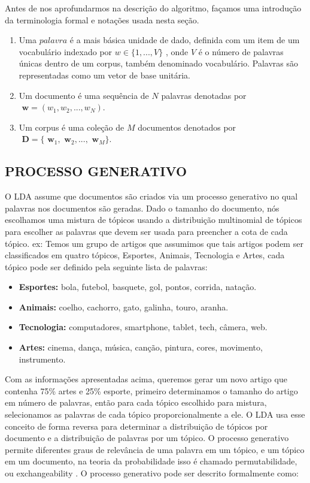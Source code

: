 \documentclass[12pt,a4paper]{article}
\begin{document}
  Antes de nos aprofundarmos na descrição do algoritmo, façamos uma introdução da terminologia formal e notações usada nesta seção.
  
  \begin{enumerate}
    \item Uma $palavra$ é a mais básica unidade de dado, definida com um item de um vocabulário indexado por \(w \in \{1,. . . , V\}\)  , onde $V$ é o número de palavras únicas dentro de um corpus, também denominado vocabulário. Palavras são representadas como um vetor de base unitária.
    \item Um documento é uma sequência de $N$ palavras denotadas por \(\textbf{ w} = (w_1, w_2,. . . ,  w_N)\).
    \item Um corpus é uma coleção de $M$ documentos denotados por \(\textbf{ D} = \{\textbf{ w}_1, \textbf{ w}_2, . . ., \textbf{ w}_M\}\).
  \end{enumerate}
  
  
  
  \subsection{PROCESSO GENERATIVO}
  O LDA assume que documentos são criados via um processo generativo no qual palavras nos documentos são geradas. Dado o tamanho do documento, nós escolhamos uma mistura de tópicos usando a distribuição multinomial de tópicos para escolher as palavras que devem ser usada para preencher a cota de cada tópico. ex: Temos um grupo de artigos que assumimos que tais artigos podem ser classificados em quatro tópicos, Esportes, Animais, Tecnologia e Artes, cada tópico pode ser definido pela seguinte lista de palavras:
  
  \begin{itemize}
    \item \textbf{ Esportes:} bola, futebol, basquete, gol, pontos, corrida, natação.
    \item \textbf{ Animais:} coelho, cachorro, gato, galinha, touro, aranha.
    \item \textbf{ Tecnologia:} computadores, smartphone, tablet, tech, câmera, web.
    \item \textbf{ Artes:} cinema, dança, música, canção, pintura, cores, movimento, instrumento.
  \end{itemize}
  
  Com as informações apresentadas acima, queremos gerar um novo artigo que contenha 75\% artes e 25\% esporte, primeiro determinamos o tamanho do artigo em número de palavras, então para cada tópico escolhido para mistura, selecionamos as palavras de cada tópico proporcionalmente a ele. O LDA usa esse conceito de forma reversa para determinar a distribuição de tópicos por documento e a distribuição de palavras por um tópico. O processo generativo permite diferentes graus de relevância de uma palavra em um tópico, e um tópico em um documento, na teoria da probabilidade isso é chamado permutabilidade, ou exchangeability \cite{aldous1985exchangeability}. O processo generativo pode ser descrito formalmente como:
  
\end{document}

